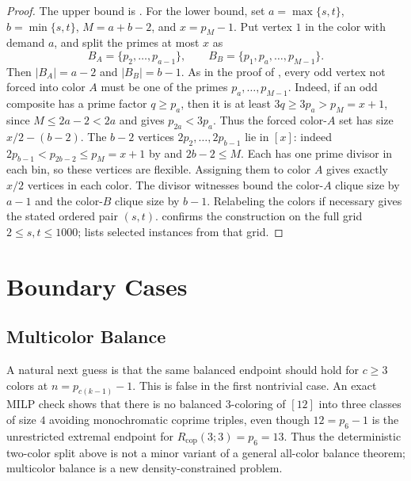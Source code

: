 \documentclass[11pt]{article}
\theoremstyle{plain}
\theoremstyle{definition}
\theoremstyle{remark}
\newcommand{\Rcop}{R_{\mathrm{cop}}}
\begin{document}
\begin{proof}
The upper bound is .  For the lower bound, set
$a=\max\{s,t\}$, $b=\min\{s,t\}$, $M=a+b-2$, and $x=p_M-1$.  Put vertex $1$
in the color with demand $a$, and split the primes at most $x$ as
\[
  B_A=\{p_2,\ldots,p_{a-1}\},\qquad
  B_B=\{p_1,p_a,\ldots,p_{M-1}\}.
\]
Then $|B_A|=a-2$ and $|B_B|=b-1$.  As in the proof of
, every odd vertex not forced into color $A$ must be
one of the primes $p_a,\ldots,p_{M-1}$.  Indeed, if an odd composite has a
prime factor $q\ge p_a$, then it is at least $3q\ge3p_a>p_M=x+1$, since
$M\le2a-2<2a$ and  gives $p_{2a}<3p_a$.
Thus the forced color-$A$ set has size $x/2-(b-2)$.  The $b-2$ vertices
$2p_2,\ldots,2p_{b-1}$ lie in $[x]$: indeed
$2p_{b-1}<p_{2b-2}\le p_M=x+1$ by  and
$2b-2\le M$.  Each has one prime divisor in each bin, so these vertices are
flexible.  Assigning them to color $A$ gives exactly $x/2$ vertices in each
color.  The divisor witnesses bound the color-$A$ clique size by $a-1$ and
the color-$B$ clique size by $b-1$.  Relabeling the colors if necessary gives
the stated ordered pair $(s,t)$.
 confirms the construction on the full
grid $2\le s,t\le1000$;  lists selected
instances from that grid.
\end{proof}

\section{Boundary Cases}
\label{sec:boundary}

\subsection{Multicolor Balance}

A natural next guess is that the same balanced endpoint should hold for
$c\ge3$ colors at $n=p_{c(k-1)}-1$.  This is false in the first nontrivial
case.  An exact MILP check shows that there is no balanced $3$-coloring of
$[12]$ into three classes of size $4$ avoiding monochromatic coprime triples,
even though $12=p_6-1$ is the unrestricted extremal endpoint for
$\Rcop(3;3)=p_6=13$.  Thus the deterministic two-color split above is not a
minor variant of a general all-color balance theorem; multicolor balance is
a new density-constrained problem.
\end{document}

